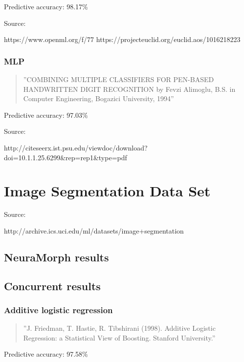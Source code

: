 \documentclass[8pt, a4paper]{article}
\begin{document}
Predictive accuracy: 98.17\%

Source:

https://www.openml.org/f/77
https://projecteuclid.org/euclid.aos/1016218223


\subsubsection{MLP}

\begin{quote}
''COMBINING MULTIPLE CLASSIFIERS FOR PEN-BASED HANDWRITTEN DIGIT RECOGNITION by Fevzi Alimoglu, B.S. in Computer Engineering, Bogazici University, 1994''
\end{quote}

Predictive accuracy: 97.03\%

Source:

http://citeseerx.ist.psu.edu/viewdoc/download?doi=10.1.1.25.6299&rep=rep1&type=pdf





\newpage
\section{Image Segmentation Data Set}

Source: 

http://archive.ics.uci.edu/ml/datasets/image+segmentation

\subsection{NeuraMorph results}



\subsection{Concurrent results}

\subsubsection{Additive logistic regression}

\begin{quote}
''J. Friedman, T. Hastie, R. Tibshirani (1998). Additive Logistic Regression: a Statistical View of Boosting. Stanford University.''
\end{quote}

Predictive accuracy: 97.58\%
\end{document}
